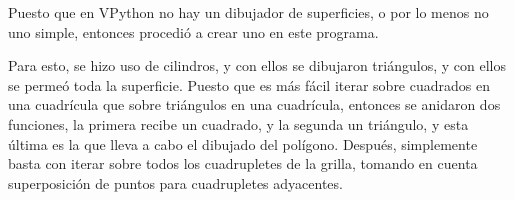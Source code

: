 \documentclass[letter]{article}
\begin{document}
Puesto que en VPython no hay un dibujador de superficies, o por lo menos no uno simple, entonces procedió a crear uno en este programa.

Para esto, se hizo uso de cilindros, y con ellos se dibujaron triángulos, y con ellos se permeó toda la superficie. Puesto que es más fácil iterar sobre cuadrados en una cuadrícula que sobre triángulos en una cuadrícula, entonces se anidaron dos funciones, la primera recibe un cuadrado, y la segunda un triángulo, y esta última es la que lleva a cabo el dibujado del polígono. Después, simplemente basta con iterar sobre todos los cuadrupletes de la grilla, tomando en cuenta superposición de puntos para cuadrupletes adyacentes.




\begin{comment}
Para la instalación y puesta en marcha de la biblioteca de Python llamada OpenCV, se hizo uso de la documentación oficial de dicha biblioteca.\footnote{http://docs.opencv.org/trunk/doc/py\_tutorials/py\_tutorials.html}\\
De dicha documentación oficial, los tutoriales útiles fueron los 3 primeros, a saber: \textit{Introduction to OpenCV}, \textit{Gui features in OpenCV} y \textit{Core operations}.\\
Se dará a continuación una descripción general de cada uno de esos tutoriales; principalmente se hará mención de los aspectos más importantes para el desarrollo de este proyecto:
\subsection{\normalsize \textit{Introduction to OpenCV}}
Antes que todo, es importante hacer mención de algunas generalidades de OpenCV. OpenCV fue iniciado en Intel, en 1999. OpenCV-Python es el API de Python para OpenCV. Este API hace uso de la capacidad que se tiene en Python de crear \textit{wrappers}, los cuales consisten en código de C o C++, el cual luego se empaqueta y es llamado desde Python. Así, básicamente lo que se hace en OpenCV-Python es un uso directo del API de OpenCV para C++, y se aprovechan además ciertas características importantes de Python.\\
Un buen conocimiento de Numpy es requerido\footnote{http://wiki.scipy.org/Tentative\_NumPy\_Tutorial}, en caso de que se quiera hacer un uso provechoso (desde el punto de vista de la escritura de códigos optimizados) de OpenCV-Python.\\
En cuanto a la versión de Python que se utilizará en este proyecto, es la 2.7.4. En Ubuntu (el sistema operativo sobre el cual se desarrolló este programa), Python viene instalado por defecto, así como python-numpy.\\
Por otro lado, es necesario instalar OpenCV:
\lstset{language=bash}
\begin{lstlisting}
$ sudo aptitude install libopencv-dev
\end{lstlisting}


\end{comment}
\end{document}
